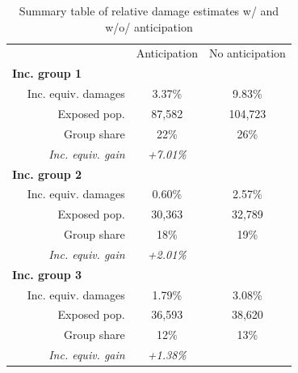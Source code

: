 \documentclass[12pt]{article}
\begin{document}
\begin{table}[htbp!]
\centering
\caption{Summary table of relative damage estimates w/ and w/o/ anticipation}
\label{tab_rel_damage_info}
\begin{tabular}{lll}
\cline{1-3}
\multicolumn{1}{c}{} &
\multicolumn{1}{c}{Anticipation} &
\multicolumn{1}{c}{No anticipation}\\
\cline{1-3}
\multicolumn{1}{l}{\textbf{Inc. group 1}} &
\multicolumn{1}{c}{} &
\multicolumn{1}{c}{}\\
\multicolumn{1}{r}{$\quad$ Inc. equiv. damages} &
\multicolumn{1}{c}{3.37\%} &
\multicolumn{1}{c}{9.83\%}\\
\multicolumn{1}{r}{$\quad$ Exposed pop.} &
\multicolumn{1}{c}{87,582} &
\multicolumn{1}{c}{104,723}\\
\multicolumn{1}{r}{$\quad$ Group share} &
\multicolumn{1}{c}{22\%} &
\multicolumn{1}{c}{26\%}\\
\multicolumn{1}{r}{$\quad$ \textit{Inc. equiv. gain}} &
\multicolumn{1}{c}{\textit{+7.01\%}} &
\multicolumn{1}{c}{\cellcolor{gray!25}}\\
\cline{1-3}
\multicolumn{1}{l}{\textbf{Inc. group 2}} &
\multicolumn{1}{c}{} &
\multicolumn{1}{c}{}\\
\multicolumn{1}{r}{$\quad$ Inc. equiv. damages} &
\multicolumn{1}{c}{0.60\%} &
\multicolumn{1}{c}{2.57\%}\\
\multicolumn{1}{r}{$\quad$ Exposed pop.} &
\multicolumn{1}{c}{30,363} &
\multicolumn{1}{c}{32,789}\\
\multicolumn{1}{r}{$\quad$ Group share} &
\multicolumn{1}{c}{18\%} &
\multicolumn{1}{c}{19\%}\\
\multicolumn{1}{r}{$\quad$ \textit{Inc. equiv. gain}} &
\multicolumn{1}{c}{\textit{+2.01\%}} &
\multicolumn{1}{c}{\cellcolor{gray!25}}\\
\cline{1-3}
\multicolumn{1}{l}{\textbf{Inc. group 3}} &
\multicolumn{1}{c}{} &
\multicolumn{1}{c}{}\\
\multicolumn{1}{r}{$\quad$ Inc. equiv. damages} &
\multicolumn{1}{c}{1.79\%} &
\multicolumn{1}{c}{3.08\%}\\
\multicolumn{1}{r}{$\quad$ Exposed pop.} &
\multicolumn{1}{c}{36,593} &
\multicolumn{1}{c}{38,620}\\
\multicolumn{1}{r}{$\quad$ Group share} &
\multicolumn{1}{c}{12\%} &
\multicolumn{1}{c}{13\%}\\
\multicolumn{1}{r}{$\quad$ \textit{Inc. equiv. gain}} &
\multicolumn{1}{c}{\textit{+1.38\%}} &
\multicolumn{1}{c}{\cellcolor{gray!25}}\\

\end{tabular}
\end{table}
\end{document}
